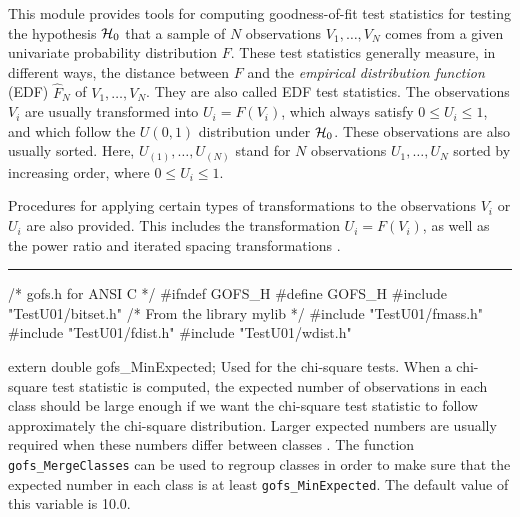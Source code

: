 
This module provides tools for computing goodness-of-fit test statistics
for testing the hypothesis $\mathcal{H}_0$ that a sample of $N$ observations
$V_1,\dots,V_N$ comes from a given univariate probability
distribution $F$.
These test statistics generally measure, in different ways, the
distance between $F$ and the {\em empirical distribution function\/}
(EDF) $\hat F_N$ of $V_1,\dots,V_N$.
They are also called EDF test statistics.
The observations $V_i$ are usually transformed into $U_i = F(V_i)$,
which always satisfy $0\le U_i\le 1$, and which
follow the $U(0,1)$ distribution under $\mathcal{H}_0$.
These observations are also usually sorted.
Here, $U_{(1)}, \dots, U_{(N)}$ stand for $N$ observations
$U_1,\dots,U_N$ sorted by increasing order, where $0\le U_i\le 1$.

Procedures for applying certain types of transformations to the
observations $V_i$ or $U_i$ are also provided.
This includes the transformation $U_i = F(V_i)$, as well as
the power ratio and iterated spacing transformations \cite{tSTE86a}.


\bigskip\hrule\medskip
\code\hide
/* gofs.h for ANSI C */
#ifndef GOFS_H
#define GOFS_H
\endhide
#include "TestU01/bitset.h"       /* From the library mylib */
#include "TestU01/fmass.h"
#include "TestU01/fdist.h"
#include "TestU01/wdist.h"
\endcode



\code


extern double gofs_MinExpected;
\endcode
  \tab  Used for the chi-square tests.
  When a chi-square test statistic is computed, the expected number
  of observations in each class should be large enough if we want
  the chi-square test statistic to follow approximately the
  chi-square distribution.  Larger expected numbers are usually
  required when these numbers differ between classes \cite{tREA88a}.
  The function {\tt gofs\_MergeClasses} can be used to regroup classes
  in order to make sure that the expected number in each class is
  at least {\tt gofs\_MinExpected}.
  The default value of this variable is 10.0.
\iffalse %
  This is for testu01:
  For some tests, the software will merge
  classes in such a way that this is always so. For others, an error
  message will be printed if this not the case (see the {\it restrictions}
  that apply for the different tests).
\fi %
  \endtab
\ifdetailed  %
\code


